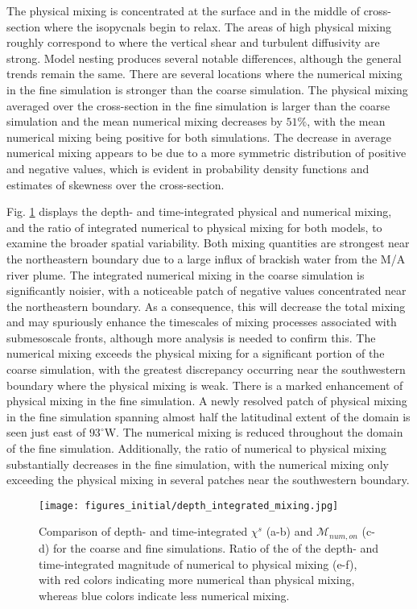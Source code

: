\documentclass[draft]{agujournal2019}
\begin{document}
The physical mixing is concentrated at the surface and in the middle of cross-section where the isopycnals begin to relax. The areas of high physical mixing roughly correspond to where the vertical shear and turbulent diffusivity are strong. Model nesting produces several notable differences, although the general trends remain the same. There are several locations where the numerical mixing in the fine simulation is stronger than the coarse simulation. The physical mixing averaged over the cross-section in the fine simulation is larger than the coarse simulation and the mean numerical mixing decreases by $51 \%$, with the mean numerical mixing being positive for both simulations. The decrease in average numerical mixing appears to be due to a more symmetric distribution of positive and negative values, which is evident in probability density functions and estimates of skewness over the cross-section.

Fig. \ref{fig:depth_integrated} displays the depth- and time-integrated physical and numerical mixing, and the ratio of integrated numerical to physical mixing for both models, to examine the broader spatial variability. Both mixing quantities are strongest near the northeastern boundary due to a large influx of brackish water from the M/A river plume. The integrated numerical mixing in the coarse simulation is significantly noisier, with a noticeable patch of negative values concentrated near the northeastern boundary. As a consequence, this will decrease the total mixing and may spuriously enhance the timescales of mixing processes associated with submesoscale fronts, although more analysis is needed to confirm this. The numerical mixing exceeds the physical mixing for a significant portion of the coarse simulation, with the greatest discrepancy occurring near the southwestern boundary where the physical mixing is weak. There is a marked enhancement of physical mixing in the fine simulation. A newly resolved patch of physical mixing in the fine simulation spanning almost half the latitudinal extent of the domain is seen just east of $93^{\circ}$W. The numerical mixing is reduced throughout the domain of the fine simulation. Additionally, the ratio of numerical to physical mixing substantially decreases in the fine simulation, with the numerical mixing only exceeding the physical mixing in several patches near the southwestern boundary. 

\begin{figure}[ht!]
 \centerline{\texttt{[image: figures\_initial/depth\_integrated\_mixing.jpg]}}
  \caption{Comparison of depth- and time-integrated $\chi^s$ (a-b) and $\mathcal{M}_{num,on}$ (c-d) for the coarse and fine simulations. Ratio of the of the depth- and time-integrated magnitude of numerical to physical mixing (e-f), with red colors indicating more numerical than physical mixing, whereas blue colors indicate less numerical mixing.}
  \label{fig:depth_integrated}
\end{figure}
\end{document}
